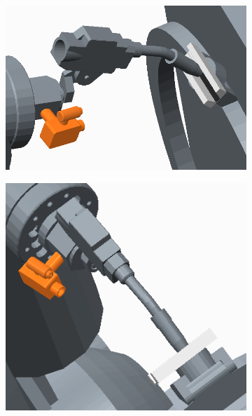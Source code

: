 \begin{figure}[h]
\begin{subfigure}[b]{0.3\textwidth}
\includegraphics[width=\textwidth]{graphics/CAD1}
\end{subfigure}
\hfill
\begin{subfigure}[b]{0.3\textwidth}
\includegraphics[width=\textwidth]{graphics/CAD2}
\end{subfigure}
\hfill
\begin{subfigure}[b]{0.3\textwidth}

\end{subfigure}
\end{figure}
